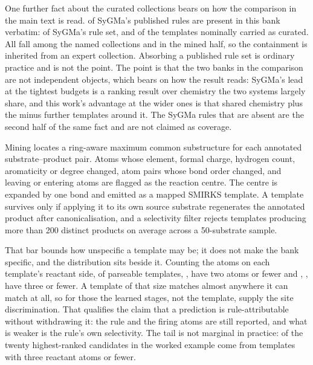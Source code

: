 \documentclass[journal=jcisd8,manuscript=suppinfo,layout=onecolumn]{achemso}
\begin{document}
One further fact about the curated collections bears on how the comparison in the main text is read.
\numSygmaInside{} of SyGMa's \numSygmaRules{} published rules are present in this bank
verbatim: \numSygmaSharePct{} of SyGMa's rule set, and \numSygmaOfcuratedPct{} of the
\numCuratedTotal{} templates nominally carried as curated.
All \numSygmaIncurated{} fall among the named collections and \numSygmaInmined{} in the mined
half, so the containment is inherited from an expert collection. Absorbing a published rule set
is ordinary practice and is not the point. The point is
that the two banks in the comparison are not independent objects, which bears on how the result
reads: SyGMa's lead at the tightest budgets is a ranking result over
chemistry the two systems largely share, and this work's advantage at the wider ones is that
shared chemistry plus the \numBankRules{} minus \numSygmaInside{} further templates around it.
The \numSygmaOutside{} SyGMa rules that are absent are the second half of the same fact and are
not claimed as coverage.

Mining locates a ring-aware maximum common substructure for each annotated substrate--product
pair. Atoms whose element, formal charge, hydrogen count, aromaticity or degree changed, atom
pairs whose bond order changed, and leaving or entering atoms are flagged as the reaction centre.
The centre is expanded by one bond and emitted as a mapped SMIRKS template. A template survives
only if applying it to its own source substrate regenerates the annotated product after
canonicalisation, and a selectivity filter rejects templates producing more than 200 distinct
products on average across a 50-substrate sample.

That bar bounds how unspecific a template may be; it does not make the bank specific, and the
distribution sits beside it. Counting the atoms on each template's reactant side,
\numRsizeLetwo{} of \numRsizeParsed{} parseable templates, \numRsizeLetwosharePct{}, have two
atoms or fewer and \numRsizeLethree{}, \numRsizeLethreesharePct{}, have three or fewer. A
template of that size matches almost anywhere it can match at all, so for those the learned
stages, not the template, supply the site discrimination. That qualifies
the claim that a prediction is rule-attributable without withdrawing it: the rule and the firing
atoms are still reported, and what is weaker is the rule's own selectivity. The tail is not
marginal in practice: \numRsizeCasetop{} of the twenty highest-ranked candidates in the worked
example come from templates with three reactant atoms or fewer.
\end{document}
